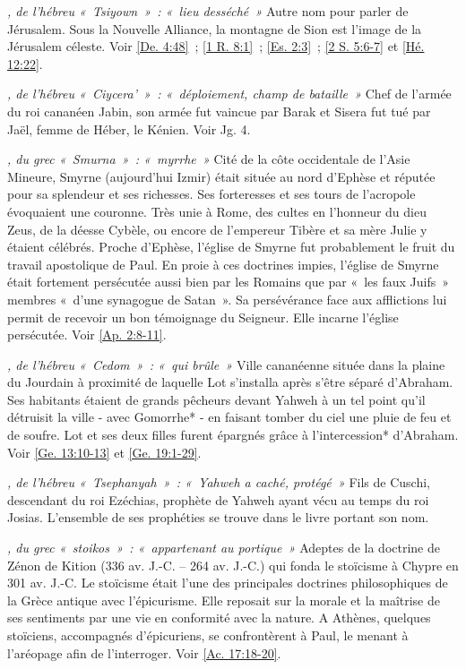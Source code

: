 \begin{multicols}{2}
\textit{, de l'hébreu «~Tsiyown~»~: «~lieu desséché~»}\newline
Autre nom pour parler de Jérusalem. Sous la Nouvelle Alliance, la montagne de Sion est l'image de la Jérusalem céleste.\newline
Voir \vref{De. 4:48}~; \vref{1 R. 8:1}~; \vref{Es. 2:3}~; \vref{2 S. 5:6-7} et \vref{Hé. 12:22}.

\textit{, de l'hébreu «~Ciycera'~»~: «~déploiement, champ de bataille~»}\newline
Chef de l'armée du roi cananéen Jabin, son armée fut vaincue par Barak et Sisera fut tué par Jaël, femme de Héber, le Kénien. Voir Jg. 4.

\textit{, du grec «~Smurna~»~: «~myrrhe~»}\newline
Cité de la côte occidentale de l'Asie Mineure, Smyrne (aujourd'hui Izmir) était située au nord d'Ephèse et réputée pour sa splendeur et ses richesses. Ses forteresses et ses tours de l'acropole évoquaient une couronne. Très unie à Rome, des cultes en l'honneur du dieu Zeus, de la déesse Cybèle, ou encore de l'empereur Tibère et sa mère Julie y étaient célébrés. Proche d'Ephèse, l'église de Smyrne fut probablement le fruit du travail apostolique de Paul. En proie à ces doctrines impies, l'église de Smyrne était fortement persécutée aussi bien par les Romains que par «~les faux Juifs~» membres «~d'une synagogue de Satan~». Sa persévérance face aux afflictions lui permit de recevoir un bon témoignage du Seigneur. Elle incarne l'église persécutée. Voir \vref{Ap. 2:8-11}.

\textit{, de l'hébreu «~Cedom~»~: «~qui brûle~»}\newline
Ville cananéenne située dans la plaine du Jourdain à proximité de laquelle Lot s'installa après s'être séparé d'Abraham. Ses habitants étaient de grands pêcheurs devant Yahweh à un tel point qu'il détruisit la ville - avec Gomorrhe* - en faisant tomber du ciel une pluie de feu et de soufre. Lot et ses deux filles furent épargnés grâce à l'intercession* d'Abraham. Voir \vref{Ge. 13:10-13} et \vref{Ge. 19:1-29}.

\textit{, de l'hébreu «~Tsephanyah~»~: «~Yahweh a caché, protégé~»}\newline
Fils de Cuschi, descendant du roi Ezéchias, prophète de Yahweh ayant vécu au temps du roi Josias. L'ensemble de ses prophéties se trouve dans le livre portant son nom.

\textit{, du grec «~stoikos~»~: «~appartenant au portique~»}\newline
Adeptes de la doctrine de Zénon de Kition (336 av. J.-C. – 264 av. J.-C.) qui fonda le stoïcisme à Chypre en 301 av. J.-C. Le stoïcisme était l'une des principales doctrines philosophiques de la Grèce antique avec l'épicurisme. Elle reposait sur la morale et la maîtrise de ses sentiments par une vie en conformité avec la nature. A Athènes, quelques stoïciens, accompagnés d'épicuriens, se confrontèrent à Paul, le menant à l'aréopage afin de l'interroger. Voir \vref{Ac. 17:18-20}.


\end{multicols}
